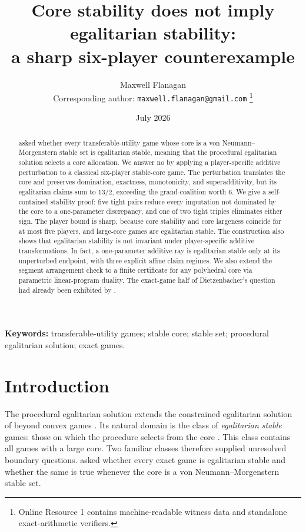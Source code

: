 \documentclass[11pt]{article}
\title{Core stability does not imply egalitarian stability:\\
a sharp six-player counterexample}
\author{Maxwell Flanagan\\[2pt]
\normalsize Corresponding author: \texttt{maxwell.flanagan@gmail.com}%
\thanks{Online Resource 1 contains machine-readable witness data and
standalone exact-arithmetic verifiers.}}
\date{July 2026}
\begin{document}
\maketitle

\begin{abstract}
\citet{Dietzenbacher2021} asked whether every transferable-utility game whose
core is a von Neumann--Morgenstern stable set is egalitarian stable, meaning
that the procedural egalitarian solution selects a core allocation. We answer
no by applying a player-specific additive perturbation to a classical
six-player stable-core game. The perturbation translates the core and
preserves domination, exactness, monotonicity, and superadditivity, but its
egalitarian claims sum to $13/2$, exceeding the grand-coalition worth $6$.
We give a self-contained stability proof: five tight pairs reduce every
imputation not dominated by the core to a one-parameter discrepancy, and one
of two tight triples eliminates either sign. The player bound is sharp,
because core stability and core largeness coincide for at most five players,
and large-core games are egalitarian stable. The construction also shows that
egalitarian stability is not invariant under player-specific additive
transformations. In fact, a one-parameter additive ray is egalitarian stable
only at its unperturbed endpoint, with three explicit affine claim regimes.
We also extend the segment arrangement check to a finite certificate for any
polyhedral core via parametric linear-program duality. The exact-game half of Dietzenbacher's question had already
been exhibited by \citet{Mauri2017}.
\end{abstract}

\medskip
\noindent\textbf{Keywords:} transferable-utility games; stable core; stable
set; procedural egalitarian solution; exact games.

\section{Introduction}\label{sec:intro}

The procedural egalitarian solution extends the constrained egalitarian
solution of \citet{DuttaRay89} beyond convex games \citep{DBH2017}. Its
natural domain is the class of
\emph{egalitarian stable} games: those on which the procedure selects from the
core \citep{Dietzenbacher2021}. This class contains all games with a large core.
Two familiar classes therefore supplied unresolved boundary questions.
\citet{Dietzenbacher2021} asked whether every exact game is egalitarian stable
and whether the same is true whenever the core is a von
Neumann--Morgenstern stable set.
\end{document}
